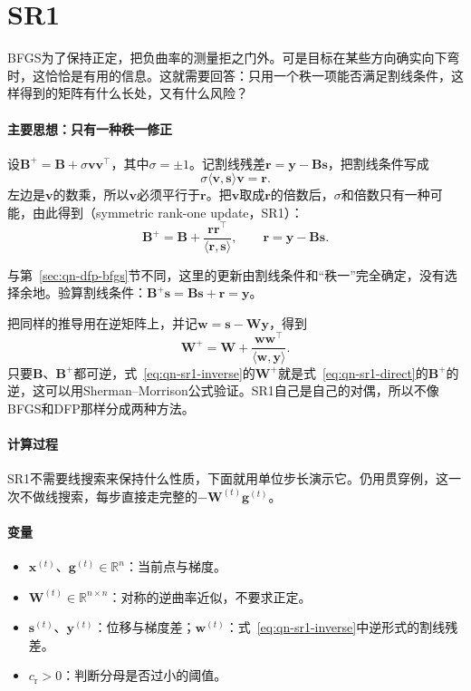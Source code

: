 \section{SR1}
\label{sec:qn-sr1}

BFGS为了保持正定，把负曲率的测量拒之门外。可是目标在某些方向确实向下弯时，这恰恰是有用的信息。这就需要回答：只用一个秩一项能否满足割线条件，这样得到的矩阵有什么长处，又有什么风险？

\paragraph{主要思想：只有一种秩一修正}
设$\bm{B}^{+}=\bm{B}+\sigma\bm{v}\bm{v}^\top$，其中$\sigma=\pm1$。记割线残差$\bm{r}=\bm{y}-\bm{B}\bm{s}$，把割线条件写成
\[
 \sigma\langle\bm{v},\bm{s}\rangle\bm{v}=\bm{r}.
\]
左边是$\bm{v}$的数乘，所以$\bm{v}$必须平行于$\bm{r}$。把$\bm{v}$取成$\bm{r}$的倍数后，$\sigma$和倍数只有一种可能，由此得到（symmetric rank-one update，SR1）：
\begin{equation}
 \bm{B}^{+}=\bm{B}+\frac{\bm{r}\bm{r}^\top}{\langle\bm{r},\bm{s}\rangle},\qquad\bm{r}=\bm{y}-\bm{B}\bm{s}.
 \label{eq:qn-sr1-direct}
\end{equation}

与第~\ref{sec:qn-dfp-bfgs}节不同，这里的更新由割线条件和“秩一”完全确定，没有选择余地。验算割线条件：$\bm{B}^{+}\bm{s}=\bm{B}\bm{s}+\bm{r}=\bm{y}$。

把同样的推导用在逆矩阵上，并记$\bm{w}=\bm{s}-\bm{W}\bm{y}$，得到
\begin{equation}
 \bm{W}^{+}=\bm{W}+\frac{\bm{w}\bm{w}^\top}{\langle\bm{w},\bm{y}\rangle}.
 \label{eq:qn-sr1-inverse}
\end{equation}
只要$\bm{B}$、$\bm{B}^{+}$都可逆，式~\eqref{eq:qn-sr1-inverse}的$\bm{W}^{+}$就是式~\eqref{eq:qn-sr1-direct}的$\bm{B}^{+}$的逆，这可以用Sherman--Morrison公式验证。SR1自己是自己的对偶，所以不像BFGS和DFP那样分成两种方法。

\paragraph{计算过程}
SR1不需要线搜索来保持什么性质，下面就用单位步长演示它。仍用贯穿例，这一次不做线搜索，每步直接走完整的$-\bm{W}^{(t)}\bm{g}^{(t)}$。

\paragraph{变量}
\begin{itemize}
 \item $\bm{x}^{(t)}$、$\bm{g}^{(t)}\in\mathbb{R}^{n}$：当前点与梯度。
 \item $\bm{W}^{(t)}\in\mathbb{R}^{n\times n}$：对称的逆曲率近似，不要求正定。
 \item $\bm{s}^{(t)}$、$\bm{y}^{(t)}$：位移与梯度差；$\bm{w}^{(t)}$：式~\eqref{eq:qn-sr1-inverse}中逆形式的割线残差。
 \item $c_{\mathrm{r}}>0$：判断分母是否过小的阈值。
\end{itemize}

